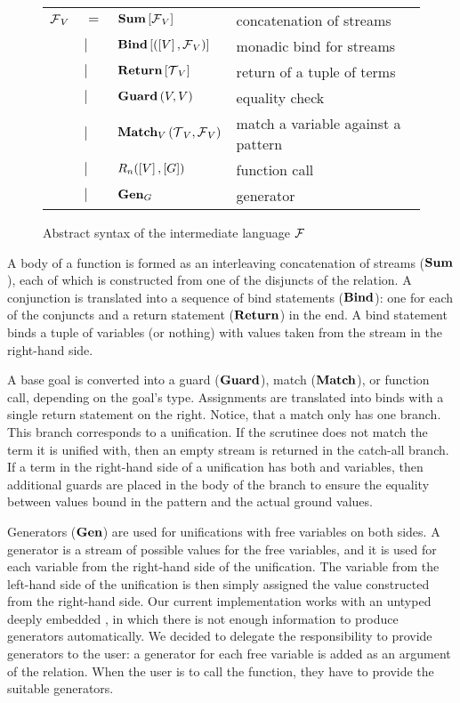 \begin{figure}[h]
\begin{tabular}{llll}
    $\operatorname{\mathcal{F}}_{V}$ & $=$ & $\operatorname{\mathbf{Sum}}\left[ \operatorname{\mathcal{F}}_{V} \right]$ & concatenation of streams\\
               & $\mid$ & $\operatorname{\mathbf{Bind}}\left[ \left(\left[ V \right], \operatorname{\mathcal{F}}_{V}\right) \right] $ & monadic bind for streams\\
               & $\mid$ & $\operatorname{\mathbf{Return}} \left[ \operatorname{\mathcal{T}}_{V} \right]$ & return of a tuple of terms\\
               & $\mid$ & $\operatorname{\mathbf{Guard}}\left( V, V \right)$ & equality check\\
               & $\mid$ & $\operatorname{\mathbf{Match}}_{V} \left( \operatorname{\mathcal{T}}_{V}, \operatorname{\mathcal{F}}_{V} \right)$ & match a variable against a pattern\\
               & $\mid$ & $R_{n}(\left[ V \right], \left[ G \right])$ & function call\\
               & $\mid$ & $\operatorname{\mathbf{Gen}}_{G}$ & generator
\end{tabular}
\caption{Abstract syntax of the intermediate language $\operatorname{\mathcal{F}}$}
\label{fig:intermediate}
\end{figure}


A body of a function is formed as an interleaving concatenation of streams ($\operatorname{\mathbf{Sum}}$), each of which is constructed from one of the disjuncts of the relation.
A conjunction is translated into a sequence of bind statements ($\operatorname{\mathbf{Bind}}$): one for each of the conjuncts and a return statement ($\operatorname{\mathbf{Return}}$) in the end.
A bind statement binds a tuple of variables (or nothing) with values taken from the stream in the right-hand side.

A base goal is converted into a guard ($\operatorname{\mathbf{Guard}}$), match ($\operatorname{\mathbf{Match}}$), or function call, depending on the goal's type.
Assignments are translated into binds with a single return statement on the right.
Notice, that a match only has one branch.
This branch corresponds to a unification.
If the scrutinee does not match the term it is unified with, then an empty stream is returned in the catch-all branch.
If a term in the right-hand side of a unification has both \outm and \inm variables, then additional guards are placed in the body of the branch to ensure the equality between values bound in the pattern and the actual ground values.

Generators ($\operatorname{\mathbf{Gen}}$) are used for unifications with free variables on both sides.
A generator is a stream of possible values for the free variables, and it is used for each variable from the right-hand side of the unification.
The variable from the left-hand side of the unification is then simply assigned the value constructed from the right-hand side.
Our current implementation works with an untyped deeply embedded \micro, in which there is not enough information to produce generators automatically.
We decided to delegate the responsibility to provide generators to the user: a generator for each free variable is added as an argument of the relation.
When the user is to call the function, they have to provide the suitable generators.

